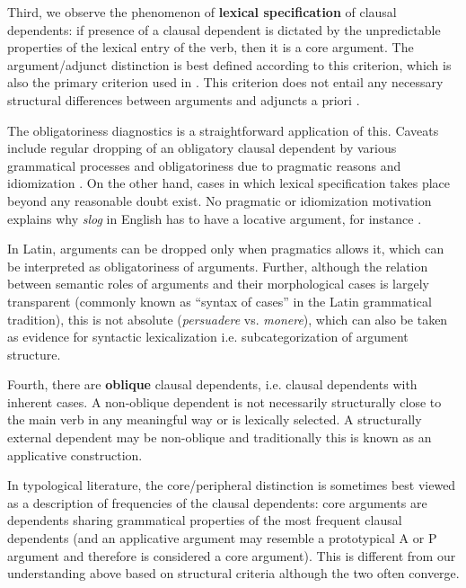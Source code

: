 \documentclass[a4paper, oneside, 12pt]{report}
\newcommand*{\citepage}[1]{p.~{#1}}
\newcommand*{\citepages}[1]{pp.~{#1}}
\newcommand*{\concept}[1]{\textbf{#1}}
\newcommand{\form}[1]{\emph{#1}}
\begin{document}
Third, we observe the phenomenon of \concept{lexical specification} of clausal dependents:
if presence of a clausal dependent is dictated by the unpredictable properties of the lexical entry of the verb, then it is a core argument.
The argument/adjunct distinction is best defined according to this criterion,
which is also the primary criterion used in \citet{cgel}.
This criterion does not entail any necessary structural differences between arguments and adjuncts a priori
\citep[\citepage{125}]{mcinnerney2022argument}.

The obligatoriness diagnostics is  a straightforward application of this.
Caveats include regular dropping of an obligatory clausal dependent by various grammatical processes and 
obligatoriness due to pragmatic reasons
\citep[\citepages{113-115}]{mcinnerney2022argument} and idiomization  \citep[\citepages{112-113}]{mcinnerney2022argument}.
On the other hand, cases in which lexical specification takes place beyond any reasonable doubt exist.
No pragmatic or idiomization motivation explains why \form{slog} in English has to have a locative argument, for instance \citep[\citepages{115-117}]{mcinnerney2022argument}.



In Latin, arguments can be dropped only when pragmatics allows it,
which can be interpreted as obligatoriness of arguments.
Further, although the relation between semantic roles of arguments and their morphological cases is largely transparent (commonly known as ``syntax of cases'' in the Latin grammatical tradition),
this is not absolute (\form{persuadere} vs. \form{monere}),
which can also be taken as evidence for syntactic lexicalization i.e. subcategorization of argument structure.

Fourth, there are \concept{oblique} clausal dependents, i.e. clausal dependents with inherent cases.
A non-oblique dependent is not necessarily structurally close to the main verb in any meaningful way or is lexically selected.
A structurally external dependent may be 
 non-oblique and traditionally this is known as an applicative construction.

In typological literature,  the core/peripheral distinction is sometimes best viewed as a description of frequencies of the clausal dependents:
core arguments are dependents sharing grammatical properties of the most frequent clausal dependents (and an applicative argument may resemble a prototypical A or P argument and therefore is considered a core argument).
This is different from our understanding above based on structural criteria although the two often converge.
\end{document}
